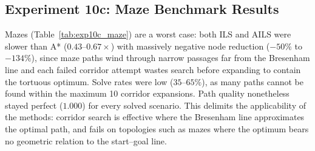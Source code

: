 \documentclass[11pt]{article}
\begin{document}
\subsection{Experiment 10c: Maze Benchmark Results}

\begin{table}[!htbp]
\centering
\caption{ILS and AILS performance on procedurally generated maze maps ($256 \times 256$, $\lambda = 0$). Solve rate denotes the fraction of scenarios where the corridor method found a path.}
\label{tab:exp10c_maze}
\end{table}

Mazes (Table~\ref{tab:exp10c_maze}) are a worst case: both ILS and AILS were slower than A* ($0.43$--$0.67\times$) with massively negative node reduction ($-50\%$ to $-134\%$), since maze paths wind through narrow passages far from the Bresenham line and each failed corridor attempt wastes search before expanding to contain the tortuous optimum. Solve rates were low ($35$--$65\%$), as many paths cannot be found within the maximum 10 corridor expansions. Path quality nonetheless stayed perfect ($1.000$) for every solved scenario. This delimits the applicability of the methods: corridor search is effective where the Bresenham line approximates the optimal path, and fails on topologies such as mazes where the optimum bears no geometric relation to the start--goal line.
\end{document}
